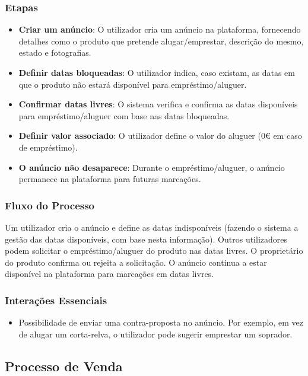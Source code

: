 \documentclass[a4paper, 12pt]{article} %
\begin{document}
\subsubsection{Etapas}
\begin{itemize}
	\item \textbf{Criar um anúncio}: O utilizador cria um anúncio na plataforma, fornecendo detalhes como o produto que pretende alugar/emprestar, descrição do mesmo, estado e fotografias.
	\item \textbf{Definir datas bloqueadas}: O utilizador indica, caso existam, as datas em que o produto não estará disponível para empréstimo/aluguer.
	\item \textbf{Confirmar datas livres}: O sistema verifica e confirma as datas disponíveis para empréstimo/aluguer com base nas datas bloqueadas.
	\item \textbf{Definir valor associado}: O utilizador define o valor do aluguer (0€ em caso de empréstimo).
	\item \textbf{O anúncio não desaparece}: Durante o empréstimo/aluguer, o anúncio permanece na plataforma para futuras marcações.
\end{itemize}

\subsubsection{Fluxo do Processo}
Um utilizador cria o anúncio e define as datas indisponíveis (fazendo o sistema a gestão das datas disponíveis, com base nesta informação). Outros utilizadores podem solicitar o empréstimo/aluguer do produto nas datas livres. O proprietário do produto confirma ou rejeita a solicitação. O anúncio continua a estar disponível na plataforma para marcações em datas livres.

\subsubsection{Interações Essenciais}
\begin{itemize}
	\item Possibilidade de enviar uma contra-proposta no anúncio. Por exemplo, em vez de alugar um corta-relva, o utilizador pode sugerir emprestar um soprador.
\end{itemize}

\subsection{Processo de Venda}
\end{document}
